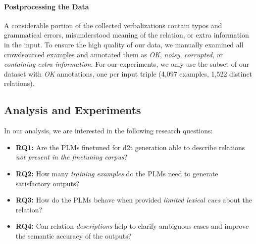 \paragraph{Postprocessing the Data}
A considerable portion of the collected verbalizations contain typos and grammatical errors, misunderstood meaning of the relation, or extra information in the input. To ensure the high quality of our data, we manually examined all crowdsourced examples and annotated them as \textit{OK}, \textit{noisy}, \textit{corrupted}, or \textit{containing extra information}. For our experiments, we only use the subset of our dataset with \textit{OK} annotations, one per input triple (4,097 examples, 1,522 distinct relations).


\subsection{Analysis and Experiments}
\label{sec:rel2text:analysis}
In our analysis, we are interested in the following research questions:
\begin{itemize}
    \item \textbf{RQ1:} Are the PLMs finetuned for \ac{d2t} generation able to describe relations \textit{not present in the finetuning corpus}?
    \item \textbf{RQ2:} How many \textit{training examples} do the PLMs need to generate satisfactory outputs?
    \item \textbf{RQ3:} How do the PLMs behave when provided \textit{limited lexical cues} about the relation?
    \item \textbf{RQ4:} Can relation \textit{descriptions} help to clarify ambiguous cases and improve the semantic accuracy of the outputs?
\end{itemize}

